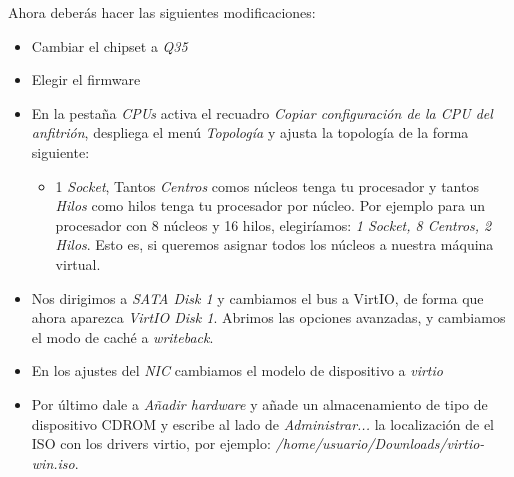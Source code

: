 \documentclass[11pt]{article}
\begin{document}
Ahora deberás hacer las siguientes modificaciones:

\begin{itemize}
\setlength\itemsep{-0.3em}
\item Cambiar el chipset a \textit{Q35}
\item Elegir el firmware 
\item En la pestaña \textit{CPUs} activa el recuadro \textit{Copiar configuración de la CPU del anfitrión}, despliega el menú \textit{Topología} y ajusta la topología de la forma siguiente:
\vspace{-20pt}
\begin{itemize}
	\item 1 \textit{Socket}, Tantos \textit{Centros} comos núcleos tenga tu procesador y tantos \textit{Hilos} como hilos tenga tu procesador por núcleo. Por ejemplo para un procesador con 8 núcleos y 16 hilos, elegiríamos: \textit{1 Socket, 8 Centros, 2 Hilos}. Esto es, si queremos asignar todos los núcleos a nuestra máquina virtual.
\end{itemize}
\item Nos dirigimos a \textit{SATA Disk 1} y cambiamos el bus a VirtIO, de forma que ahora aparezca \textit{VirtIO Disk 1}. Abrimos las opciones avanzadas, y cambiamos el modo de caché a \textit{writeback}.
\item En los ajustes del \textit{NIC} cambiamos el modelo de dispositivo a \textit{virtio}
\item Por último dale a \textit{Añadir hardware} y añade un almacenamiento de tipo de dispositivo CDROM y escribe al lado de \textit{Administrar...} la localización de el ISO con los drivers virtio, por ejemplo: \textit{/home/usuario/Downloads/virtio-win.iso}.
\end{itemize}
\end{document}
